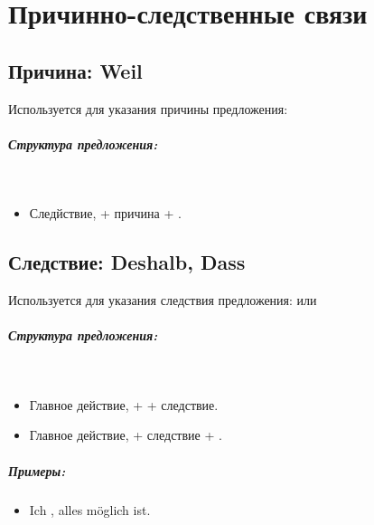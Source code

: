 \chapter{Причинно-следственные связи}

\section{Причина: Weil}

Используется для указания причины предложения: 

\paragraph{Структура предложения:} ~\\
\begin{itemize}
\item Следйствие,  + причина + \dverb{}.
\end{itemize}

\section{Следствие: Deshalb, Dass}

Используется для указания следствия предложения:  или 

\paragraph{Структура предложения:} ~\\
\begin{itemize}
\item Главное действие,  + \dverb{} + следствие.
\item Главное действие,  + следствие + \dverb{}.
\end{itemize}

\paragraph{Примеры:}
\begin{itemize}
    \item Ich ,  alles möglich ist.
          ~\\ 
\end{itemize}

